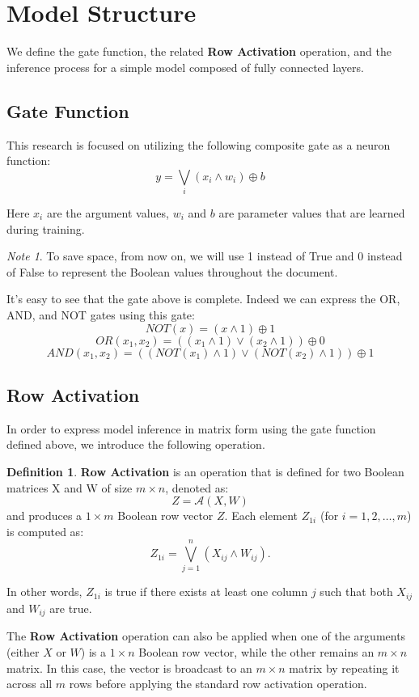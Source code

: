 \documentclass{article}
\theoremstyle{definition}
\newtheorem*{definition}{Definition}
\theoremstyle{remark}
\newtheorem*{note}{Note}
\begin{document}
\section{Model Structure}
We define the gate function, the related \textbf{Row Activation} operation, and the inference process for a simple model composed of fully connected layers.

\subsection{Gate Function}
This research is focused on utilizing the following composite gate as a neuron function:
\[ y = \bigvee_{i} \left( x_{i} \wedge w_{i} \right) \oplus b \]

Here \(x_{i}\) are the argument values, \(w_{i}\) and \(b\) are parameter values that are learned during training.

\begin{note}
    To save space, from now on, we will use 1 instead of True and 0 instead of False to represent the Boolean values throughout the document.
\end{note}

It's easy to see that the gate above is complete. Indeed we can  express the OR, AND, and NOT gates using this gate:
\[ NOT(x) = \left( x \wedge 1 \right) \oplus 1 \]
\[ OR(x_1, x_2) = \left(\left( x_1 \wedge 1 \right) \vee \left( x_2 \wedge 1 \right) \right) \oplus 0 \]
\[ AND(x_1, x_2) = \left(\left( NOT(x_1) \wedge 1 \right) \vee \left( NOT(x_2) \wedge 1 \right) \right) \oplus 1 \]

\subsection{Row Activation}
In order to express model inference in matrix form using the gate function defined above, we introduce the following operation.

\begin{definition}
    \textbf{Row Activation} is an operation that is defined for two Boolean matrices X and W of size \( m \times n \), denoted as:
    \[ Z = \mathcal{A}(X, W) \]
    and produces a \( 1 \times m \) Boolean row vector \( Z \). Each element \( Z_{1i} \) (for \( i = 1, 2, \dots, m \)) is computed as:
    \[ Z_{1i} = \bigvee_{j=1}^{n} \left( X_{ij} \wedge W_{ij} \right). \]

    In other words, \( Z_{1i} \) is true if there exists at least one column \( j \) such that both \( X_{ij} \) and \( W_{ij} \) are true.

    The \textbf{Row Activation} operation can also be applied when one of the arguments (either \( X \) or \( W \)) is a \( 1 \times n \) Boolean row vector, while the other remains an \( m \times n \) matrix. In this case, the vector is broadcast to an \( m \times n \) matrix by repeating it across all \( m \) rows before applying the standard row activation operation.
\end{definition}
\end{document}
